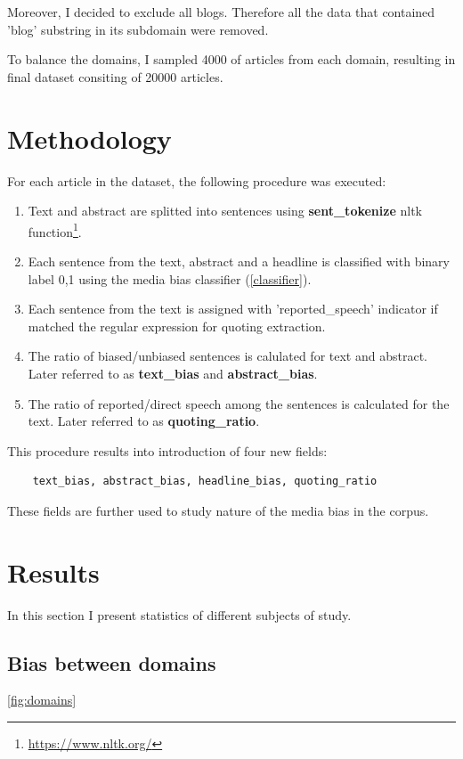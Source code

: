 Moreover, I decided to exclude all blogs. Therefore all the data that contained 'blog' substring in its subdomain were removed.

To balance the domains, I sampled 4000 of articles from each domain, resulting in final dataset consiting of 20000 articles.


\section{Methodology}
For each article in the dataset, the following procedure was executed:
\begin{enumerate}
    \item Text and abstract are splitted into sentences using \textbf{sent\_tokenize} nltk function\footnote{\url{https://www.nltk.org/}}.
    \item Each sentence from the text, abstract and a headline is classified with binary label 0,1 using the media bias classifier (\ref{classifier}).
    \item Each sentence from the text is assigned with 'reported\_speech' indicator if matched the regular expression for quoting extraction. 
    \item The ratio of biased/unbiased sentences is calulated for text and abstract. Later referred to as \textbf{text\_bias} and \textbf{abstract\_bias}.
    \item The ratio of reported/direct speech among the sentences is calculated for the text. Later referred to as \textbf{quoting\_ratio}.
\end{enumerate}

This procedure results into introduction of four new fields:

\begin{verbatim}
    text_bias, abstract_bias, headline_bias, quoting_ratio
\end{verbatim}

These fields are further used to study nature of the media bias in the corpus.

\section{Results}
In this section I present statistics of different subjects of study.

\tocless\subsection{Bias between domains}
\ref{fig:domains}


